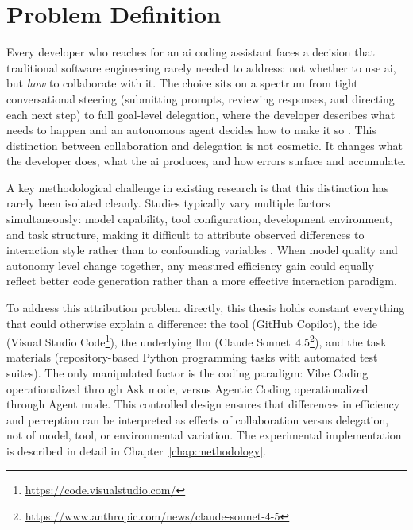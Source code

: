 \section{Problem Definition}
\label{sec:intro-problem}

Every developer who reaches for an \gls{ai} coding assistant faces a decision that traditional software engineering rarely needed to address: not whether to use \gls{ai}, but \emph{how} to collaborate with it. The choice sits on a spectrum from tight conversational steering (submitting prompts, reviewing responses, and directing each next step) to full goal-level delegation, where the developer describes what needs to happen and an autonomous agent decides how to make it so \parencite{sarkar2025codewithme}. This distinction between collaboration and delegation is not cosmetic. It changes what the developer does, what the \gls{ai} produces, and how errors surface and accumulate.

A key methodological challenge in existing research is that this distinction has rarely been isolated cleanly. Studies typically vary multiple factors simultaneously: model capability, tool configuration, development environment, and task structure, making it difficult to attribute observed differences to interaction style rather than to confounding variables \parencite{wohlin2012experimentation}. When model quality and autonomy level change together, any measured efficiency gain could equally reflect better code generation rather than a more effective interaction paradigm.

To address this attribution problem directly, this thesis holds constant everything that could otherwise explain a difference: the tool (GitHub Copilot), the \gls{ide} (Visual Studio Code\footnote{\url{https://code.visualstudio.com/}}), the underlying \gls{llm} (Claude Sonnet~4.5\footnote{\url{https://www.anthropic.com/news/claude-sonnet-4-5}}), and the task materials (repository-based Python programming tasks with automated test suites). The only manipulated factor is the coding paradigm: Vibe Coding operationalized through Ask mode, versus Agentic Coding operationalized through Agent mode. This controlled design ensures that differences in efficiency and perception can be interpreted as effects of collaboration versus delegation, not of model, tool, or environmental variation. The experimental implementation is described in detail in Chapter~\ref{chap:methodology}.

